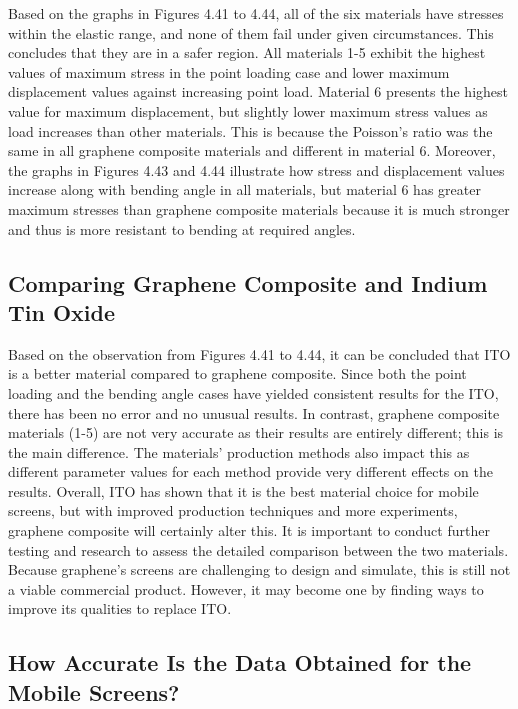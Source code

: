 \documentclass[a4paper,12pt]{article}
\numberwithin{equation}{section}
\numberwithin{figure}{section}
\begin{document}
\noindent Based on the graphs in Figures 4.41 to 4.44, all of the six materials have stresses within the elastic range, and none of them fail under given circumstances. This concludes that they are in a safer region. All materials 1-5 exhibit the highest values of maximum stress in the point loading case and lower maximum displacement values against increasing point load. Material 6 presents the highest value for maximum displacement, but slightly lower maximum stress values as load increases than other materials. This is because the Poisson’s ratio was the same in all graphene composite materials and different in material 6. Moreover, the graphs in Figures 4.43 and 4.44 illustrate how stress and displacement values increase along with bending angle in all materials, but material 6 has greater maximum stresses than graphene composite materials because it is much stronger and thus is more resistant to bending at required angles.

\subsection{Comparing Graphene Composite and Indium Tin Oxide}

\noindent Based on the observation from Figures 4.41 to 4.44, it can be concluded that ITO is a better material compared to graphene composite. Since both the point loading and the bending angle cases have yielded consistent results for the ITO, there has been no error and no unusual results. In contrast, graphene composite materials (1-5) are not very accurate as their results are entirely different; this is the main difference. The materials' production methods also impact this as different parameter values for each method provide very different effects on the results. Overall, ITO has shown that it is the best material choice for mobile screens, but with improved production techniques and more experiments, graphene composite will certainly alter this. It is important to conduct further testing and research to assess the detailed comparison between the two materials. Because graphene's screens are challenging to design and simulate, this is still not a viable commercial product. However, it may become one by finding ways to improve its qualities to replace ITO.

\subsection{How Accurate Is the Data Obtained for the Mobile Screens?}
\end{document}
